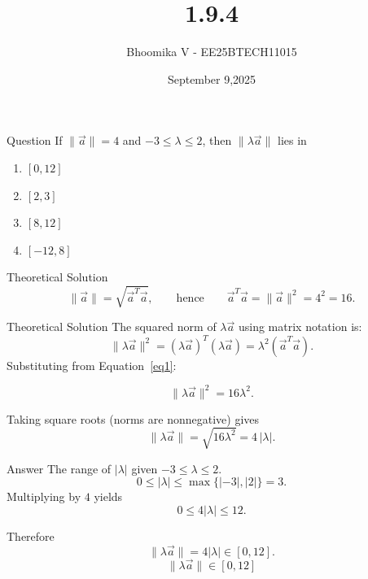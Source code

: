 \documentclass{beamer}
\begin{document}
\title 
{1.9.4}
\date{September 9,2025}


\author 
{Bhoomika V - EE25BTECH11015}




\frame{\titlepage}
\begin{frame}{Question}
If $\lVert \vec{a} \rVert = 4$ and $-3 \le \lambda \le 2$, then $\lVert \lambda \vec{a} \rVert$ lies in
\begin{enumerate}
  \item $[0,12]$
  \item $[2,3]$
  \item $[8,12]$
  \item $[-12,8]$
\end{enumerate} 
\end{frame}



\begin{frame}{Theoretical Solution}
\begin{equation}
  \|\vec{a}\| = \sqrt{\vec{a}^T \vec{a}}, 
  \qquad \text{hence} \qquad 
  \vec{a}^T \vec{a} = \|\vec{a}\|^2 = 4^2 = 16.
  \label{eq1}
\end{equation}
\end{frame}




\begin{frame}{Theoretical Solution}
  The squared norm of \(\lambda \vec{a}\) using matrix notation is:
  \[
    \|\lambda \vec{a}\|^2 = (\lambda \vec{a})^T(\lambda \vec{a}) 
    = \lambda^2 (\vec{a}^T \vec{a}).
  \]
  Substituting from Equation~\eqref{eq1}:

  \[
    \|\lambda \vec{a}\|^2 = 16 \lambda^2.
  \]

  Taking square roots (norms are nonnegative) gives
  \[
    \|\lambda \vec{a}\| = \sqrt{16\lambda^2} = 4\,|\lambda|.
  \]  


\end{frame}

\begin{frame}{Answer}
 The range of \(|\lambda|\) given \(-3 \le \lambda \le 2\).
  \[
    0 \le |\lambda| \le \max\{|-3|,|2|\} = 3.
  \]
  Multiplying by \(4\) yields
  \[
    0 \le 4|\lambda| \le 12.
  \]

  Therefore
  \[
    \|\lambda \vec{a}\| = 4|\lambda| \in [0,12].
  \]
  \[
    \boxed{\; \|\lambda \vec{a}\| \in [0,12]\; }
  \]

\end{frame}
\end{document}
